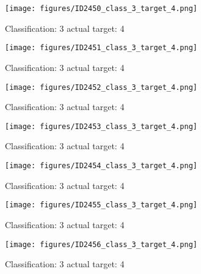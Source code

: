 \begin{figure}[h!]
\begin{center}
\texttt{[image: figures/ID2450\_class\_3\_target\_4.png]}
\end{center}
\caption{ Classification: 3 actual target: 4}
\label{fig:ID2450_class_3_target_4}
\end{figure}
\begin{figure}[h!]
\begin{center}
\texttt{[image: figures/ID2451\_class\_3\_target\_4.png]}
\end{center}
\caption{ Classification: 3 actual target: 4}
\label{fig:ID2451_class_3_target_4}
\end{figure}
\begin{figure}[h!]
\begin{center}
\texttt{[image: figures/ID2452\_class\_3\_target\_4.png]}
\end{center}
\caption{ Classification: 3 actual target: 4}
\label{fig:ID2452_class_3_target_4}
\end{figure}
\begin{figure}[h!]
\begin{center}
\texttt{[image: figures/ID2453\_class\_3\_target\_4.png]}
\end{center}
\caption{ Classification: 3 actual target: 4}
\label{fig:ID2453_class_3_target_4}
\end{figure}
\begin{figure}[h!]
\begin{center}
\texttt{[image: figures/ID2454\_class\_3\_target\_4.png]}
\end{center}
\caption{ Classification: 3 actual target: 4}
\label{fig:ID2454_class_3_target_4}
\end{figure}
\begin{figure}[h!]
\begin{center}
\texttt{[image: figures/ID2455\_class\_3\_target\_4.png]}
\end{center}
\caption{ Classification: 3 actual target: 4}
\label{fig:ID2455_class_3_target_4}
\end{figure}
\begin{figure}[h!]
\begin{center}
\texttt{[image: figures/ID2456\_class\_3\_target\_4.png]}
\end{center}
\caption{ Classification: 3 actual target: 4}
\label{fig:ID2456_class_3_target_4}
\end{figure}
